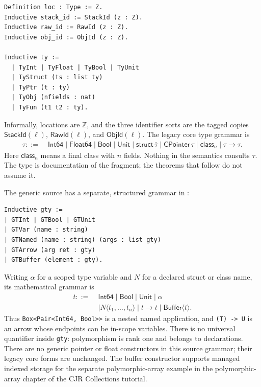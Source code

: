 \documentclass[11pt]{article}
\begin{document}
\begin{lstlisting}
Definition loc : Type := Z.
Inductive stack_id := StackId (z : Z).
Inductive raw_id := RawId (z : Z).
Inductive obj_id := ObjId (z : Z).

Inductive ty :=
  | TyInt | TyFloat | TyBool | TyUnit
  | TyStruct (ts : list ty)
  | TyPtr (t : ty)
  | TyObj (nfields : nat)
  | TyFun (t1 t2 : ty).
\end{lstlisting}

Informally, locations are \(\mathbb{Z}\), and the three identifier sorts are the tagged copies \(\mathsf{StackId}(\ell)\), \(\mathsf{RawId}(\ell)\), and \(\mathsf{ObjId}(\ell)\).
The legacy core type grammar is
\[
\begin{aligned}
\tau ::=\;&
  \mathsf{Int64}
  \mid \mathsf{Float64}
  \mid \mathsf{Bool}
  \mid \mathsf{Unit}
  \mid \mathsf{struct}\,\overline{\tau}
  \mid \mathsf{CPointer}\,\tau
  \mid \mathsf{class}_{n}
  \mid \tau \to \tau.
\end{aligned}
\]
Here \(\mathsf{class}_{n}\) means a final class with \(n\) fields.
Nothing in the semantics consults \(\tau\).
The type is documentation of the fragment; the theorems that follow do not assume it.

The generic source has a separate, structured grammar in
:
\begin{lstlisting}
Inductive gty :=
| GTInt | GTBool | GTUnit
| GTVar (name : string)
| GTNamed (name : string) (args : list gty)
| GTArrow (arg ret : gty)
| GTBuffer (element : gty).
\end{lstlisting}
Writing \(\alpha\) for a scoped type variable and \(N\) for a declared
struct or class name, its mathematical grammar is
\[
\begin{aligned}
  t ::=\;& \mathsf{Int64}\mid\mathsf{Bool}\mid\mathsf{Unit}\mid\alpha\\
        &\mid N\langle t_1,\ldots,t_n\rangle\mid t\to t
         \mid\mathsf{Buffer}\langle t\rangle.
\end{aligned}
\]
Thus \texttt{Box<Pair<Int64, Bool>>} is a nested named application, and
\texttt{(T) -> U} is an arrow whose endpoints can be in-scope variables.
There is no universal quantifier inside \texttt{gty}: polymorphism is
rank one and belongs to declarations. There are no generic pointer or float
constructors in this source grammar; their legacy core forms are unchanged.
The buffer constructor supports managed indexed storage for the separate
polymorphic-array example in the polymorphic-array chapter of the CJR Collections tutorial.
\end{document}
